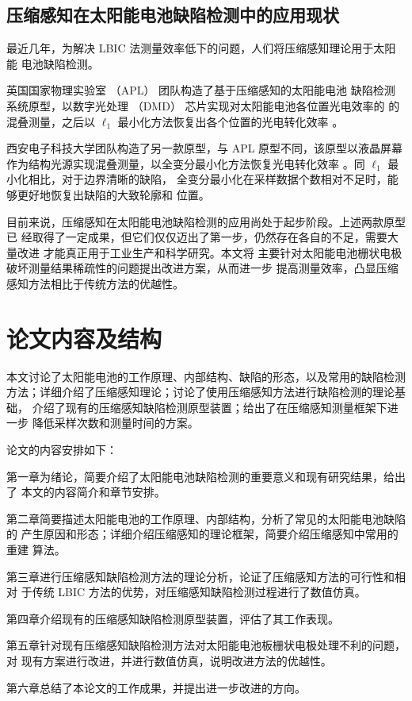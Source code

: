 \subsection{压缩感知在太阳能电池缺陷检测中的应用现状}

最近几年，为解决 LBIC 法测量效率低下的问题，人们将压缩感知理论用于太阳能
电池缺陷检测。

英国国家物理实验室 （APL） 团队构造了基于压缩感知的太阳能电池
缺陷检测系统原型，以数字光处理 （DMD） 芯片实现对太阳能电池各位置光电效率的
的混叠测量，之后以 $\ell_1$ 最小化方法恢复出各个位置的光电转化效率
\cite{CLBIC16, CLBIC17} 。

西安电子科技大学团队构造了另一款原型，与 APL 原型不同，该原型以液晶屏幕
作为结构光源实现混叠测量，以全变分最小化方法恢复光电转化效率
\cite{XDUCLBIC}。同 $\ell_1$ 最小化相比，对于边界清晰的缺陷，
全变分最小化在采样数据个数相对不足时，能够更好地恢复出缺陷的大致轮廓和
位置。

目前来说，压缩感知在太阳能电池缺陷检测的应用尚处于起步阶段。上述两款原型已
经取得了一定成果，但它们仅仅迈出了第一步，仍然存在各自的不足，需要大量改进
才能真正用于工业生产和科学研究。本文将
主要针对太阳能电池栅状电极破坏测量结果稀疏性的问题提出改进方案，从而进一步
提高测量效率，凸显压缩感知方法相比于传统方法的优越性。

\section{论文内容及结构}

本文讨论了太阳能电池的工作原理、内部结构、缺陷的形态，以及常用的缺陷检测
方法；详细介绍了压缩感知理论；讨论了使用压缩感知方法进行缺陷检测的理论基础，
介绍了现有的压缩感知缺陷检测原型装置；给出了在压缩感知测量框架下进一步
降低采样次数和测量时间的方案。

论文的内容安排如下：

第一章为绪论，简要介绍了太阳能电池缺陷检测的重要意义和现有研究结果，给出了
本文的内容简介和章节安排。

第二章简要描述太阳能电池的工作原理、内部结构，分析了常见的太阳能电池缺陷的
产生原因和形态；详细介绍压缩感知的理论框架，简要介绍压缩感知中常用的重建
算法。

第三章进行压缩感知缺陷检测方法的理论分析，论证了压缩感知方法的可行性和相对
于传统 LBIC 方法的优势，对压缩感知缺陷检测过程进行了数值仿真。

第四章介绍现有的压缩感知缺陷检测原型装置，评估了其工作表现。

第五章针对现有压缩感知缺陷检测方法对太阳能电池板栅状电极处理不利的问题，对
现有方案进行改进，并进行数值仿真，说明改进方法的优越性。

第六章总结了本论文的工作成果，并提出进一步改进的方向。
